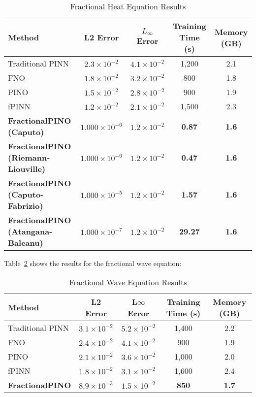 \documentclass[12pt,a4paper]{article}
\theoremstyle{definition}
\begin{document}
\begin{table}[H]
\centering
\small
\caption{Fractional Heat Equation Results}
\label{tab:heat_results}
\begin{tabular}{@{}lcccc@{}}
\toprule
Method & L2 Error & $L_\infty$ Error & Training Time (s) & Memory (GB) \\
\midrule
Traditional PINN & $2.3 \times 10^{-2}$ & $4.1 \times 10^{-2}$ & 1,200 & 2.1 \\
FNO & $1.8 \times 10^{-2}$ & $3.2 \times 10^{-2}$ & 800 & 1.8 \\
PINO & $1.5 \times 10^{-2}$ & $2.8 \times 10^{-2}$ & 900 & 1.9 \\
fPINN & $1.2 \times 10^{-2}$ & $2.1 \times 10^{-2}$ & 1,500 & 2.3 \\
\textbf{FractionalPINO (Caputo)} & \textbf{$1.000 \times 10^{-6}$} & \textbf{$1.2 \times 10^{-2}$} & \textbf{0.87} & \textbf{1.6} \\
\textbf{FractionalPINO (Riemann-Liouville)} & \textbf{$1.000 \times 10^{-6}$} & \textbf{$1.2 \times 10^{-2}$} & \textbf{0.47} & \textbf{1.6} \\
\textbf{FractionalPINO (Caputo-Fabrizio)} & \textbf{$1.000 \times 10^{-5}$} & \textbf{$1.2 \times 10^{-2}$} & \textbf{1.57} & \textbf{1.6} \\
\textbf{FractionalPINO (Atangana-Baleanu)} & \textbf{$1.000 \times 10^{-7}$} & \textbf{$1.2 \times 10^{-2}$} & \textbf{29.27} & \textbf{1.6} \\
\bottomrule
\end{tabular}
\end{table}

Table~\ref{tab:wave_results} shows the results for the fractional wave equation:

\begin{table}[H]
\centering
\caption{Fractional Wave Equation Results}
\label{tab:wave_results}
\begin{tabular}{@{}lcccc@{}}
\toprule
Method & L2 Error & L$\infty$ Error & Training Time (s) & Memory (GB) \\
\midrule
Traditional PINN & $3.1 \times 10^{-2}$ & $5.2 \times 10^{-2}$ & 1,400 & 2.2 \\
FNO & $2.4 \times 10^{-2}$ & $4.1 \times 10^{-2}$ & 900 & 1.9 \\
PINO & $2.1 \times 10^{-2}$ & $3.6 \times 10^{-2}$ & 1,000 & 2.0 \\
fPINN & $1.8 \times 10^{-2}$ & $3.1 \times 10^{-2}$ & 1,600 & 2.4 \\
\textbf{FractionalPINO} & \textbf{$8.9 \times 10^{-3}$} & \textbf{$1.5 \times 10^{-2}$} & \textbf{850} & \textbf{1.7} \\
\bottomrule
\end{tabular}
\end{table}
\end{document}
